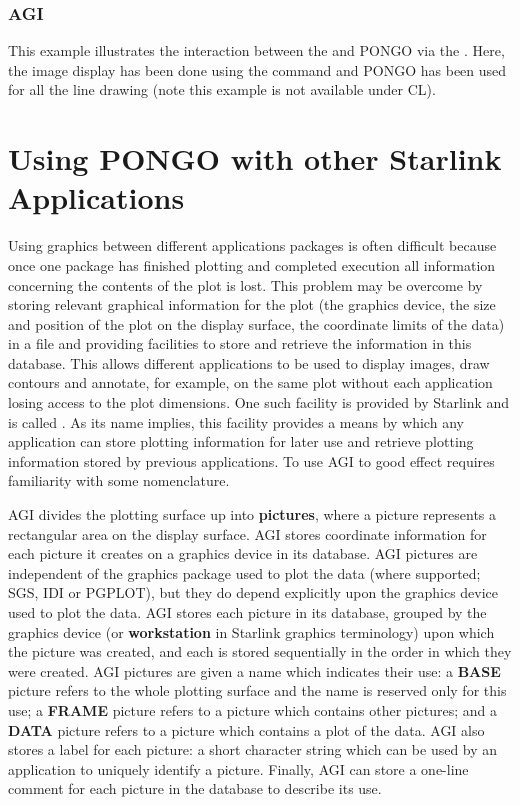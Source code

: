 \newpage
\subsubsection{AGI}

This example illustrates the interaction between the  and PONGO via the .  Here, the image display has been done using the
 command and PONGO has been
used for all the line drawing (note this example is not available
under CL).

\newpage


\section{Using PONGO with other Starlink Applications}

Using graphics between different applications packages is often difficult
because once one package has finished plotting and completed execution all
information concerning the contents of the plot is lost.
This problem may be overcome by storing relevant graphical information for the
plot (\eg the graphics device, the size and position of the plot on the display
surface, the coordinate limits of the data) in a file and providing facilities
to store and retrieve the information in this database.
This allows different applications to be used to display images, draw contours
and  annotate, for example, on the same plot without each application losing
access to the plot dimensions.
One such facility is provided by Starlink and is called
.
As its name implies, this facility provides a means by which any application
can store plotting information for later use and retrieve plotting information
stored by previous applications.
To use AGI to good effect requires familiarity with some nomenclature.

AGI divides the plotting surface up into {\bf pictures}, where a picture
represents a rectangular area on the display surface.
AGI stores coordinate information for each picture it creates on a graphics
device in its database.
AGI pictures are independent of the graphics package used to plot the data
(where supported; \ie SGS, IDI or PGPLOT), but they do depend explicitly upon
the graphics device used to plot the data.
AGI stores each picture in its database, grouped by the graphics device (or
{\bf workstation} in Starlink graphics terminology) upon which the picture was
created, and each is stored sequentially in the order in which they were
created.
AGI pictures are given a name which indicates their use:
a {\bf BASE} picture refers to the whole plotting surface and the name is
reserved only for this use;
a {\bf FRAME} picture refers to a picture which contains other pictures;
and a {\bf DATA} picture refers to a picture which contains a plot of the data.
AGI also stores a label for each picture: a short character string which
can be used by an application to uniquely identify a picture.
Finally, AGI can store a one-line comment for each picture in the database to
describe its use.

